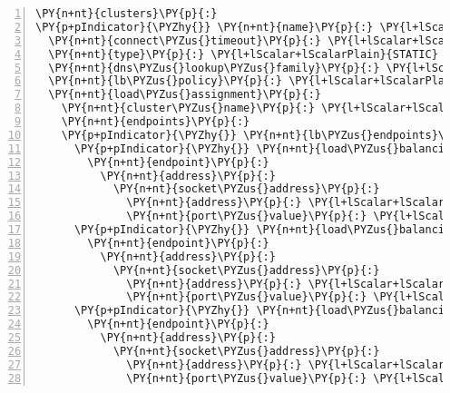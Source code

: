 \begin{Verbatim}[commandchars=\\\{\},numbers=left,firstnumber=1,stepnumber=1,frame=single]
\PY{n+nt}{clusters}\PY{p}{:}
\PY{p+pIndicator}{\PYZhy{}} \PY{n+nt}{name}\PY{p}{:} \PY{l+lScalar+lScalarPlain}{hivemq}
  \PY{n+nt}{connect\PYZus{}timeout}\PY{p}{:} \PY{l+lScalar+lScalarPlain}{0.25s}
  \PY{n+nt}{type}\PY{p}{:} \PY{l+lScalar+lScalarPlain}{STATIC}
  \PY{n+nt}{dns\PYZus{}lookup\PYZus{}family}\PY{p}{:} \PY{l+lScalar+lScalarPlain}{v4\PYZus{}only}
  \PY{n+nt}{lb\PYZus{}policy}\PY{p}{:} \PY{l+lScalar+lScalarPlain}{round\PYZus{}robin}
  \PY{n+nt}{load\PYZus{}assignment}\PY{p}{:}
    \PY{n+nt}{cluster\PYZus{}name}\PY{p}{:} \PY{l+lScalar+lScalarPlain}{hivemq}
    \PY{n+nt}{endpoints}\PY{p}{:}
    \PY{p+pIndicator}{\PYZhy{}} \PY{n+nt}{lb\PYZus{}endpoints}\PY{p}{:}
      \PY{p+pIndicator}{\PYZhy{}} \PY{n+nt}{load\PYZus{}balancing\PYZus{}weight}\PY{p}{:} \PY{l+lScalar+lScalarPlain}{10}
        \PY{n+nt}{endpoint}\PY{p}{:}
          \PY{n+nt}{address}\PY{p}{:}
            \PY{n+nt}{socket\PYZus{}address}\PY{p}{:}
              \PY{n+nt}{address}\PY{p}{:} \PY{l+lScalar+lScalarPlain}{192.168.0.2}
              \PY{n+nt}{port\PYZus{}value}\PY{p}{:} \PY{l+lScalar+lScalarPlain}{1883}
      \PY{p+pIndicator}{\PYZhy{}} \PY{n+nt}{load\PYZus{}balancing\PYZus{}weight}\PY{p}{:} \PY{l+lScalar+lScalarPlain}{10}
        \PY{n+nt}{endpoint}\PY{p}{:}
          \PY{n+nt}{address}\PY{p}{:}
            \PY{n+nt}{socket\PYZus{}address}\PY{p}{:}
              \PY{n+nt}{address}\PY{p}{:} \PY{l+lScalar+lScalarPlain}{192.168.0.3}
              \PY{n+nt}{port\PYZus{}value}\PY{p}{:} \PY{l+lScalar+lScalarPlain}{1883}
      \PY{p+pIndicator}{\PYZhy{}} \PY{n+nt}{load\PYZus{}balancing\PYZus{}weight}\PY{p}{:} \PY{l+lScalar+lScalarPlain}{5}
        \PY{n+nt}{endpoint}\PY{p}{:}
          \PY{n+nt}{address}\PY{p}{:}
            \PY{n+nt}{socket\PYZus{}address}\PY{p}{:}
              \PY{n+nt}{address}\PY{p}{:} \PY{l+lScalar+lScalarPlain}{192.168.0.4}
              \PY{n+nt}{port\PYZus{}value}\PY{p}{:} \PY{l+lScalar+lScalarPlain}{1883}
\end{Verbatim}
